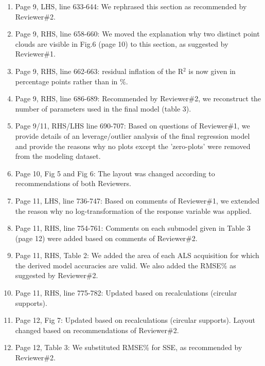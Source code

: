 \documentclass{article}
\begin{document}
\begin{enumerate}
	\item Page 9, LHS, line 633-644: We rephrased this section as recommended by Reviewer\#2.
	
	\item Page 9, RHS, line 658-660: We moved the explanation why two distinct point clouds are visible in Fig.6 (page 10) to this section, as suggested by Reviewer\#1.
	
	\item Page 9, RHS, line 662-663: residual inflation of the R$^2$ is now given in percentage points rather than in \%.
	
	\item Page 9, RHS, line 686-689: Recommended by Reviewer\#2, we reconstruct the number of parameters used in the final model (table 3). 
	
	\item Page 9/11, RHS/LHS line 690-707: Based on questions of Reviewer\#1, we provide details of an leverage/outlier analysis of the final regression model and provide the reasons why no plots except the 'zero-plots' were removed from the modeling dataset. 
	
	\item Page 10, Fig 5 and Fig 6: The layout was changed according to recommendations of both Reviewers. 
	
	\item Page 11, LHS, line 736-747: Based on comments of Reviewer\#1, we extended the reason why no log-transformation of the response variable was applied.
	
	\item Page 11, RHS, line 754-761: Comments on each submodel given in Table 3 (page 12) were added based on comments of Reviewer\#2.
	
	\item Page 11, RHS, Table 2: We added the area of each ALS acquisition for which the derived model accuracies are valid. We also added the RMSE\% as suggested by Reviewer\#2.
	
	\item Page 11, RHS, line 775-782: Updated based on recalculations (circular supports).
	
	\item Page 12, Fig 7:  Updated based on recalculations (circular supports). Layout changed based on recommendations of Reviewer\#2.
	
	\item Page 12, Table 3: We substituted RMSE\% for SSE, as recommended by Reviewer\#2.
	

\end{enumerate}
\end{document}
